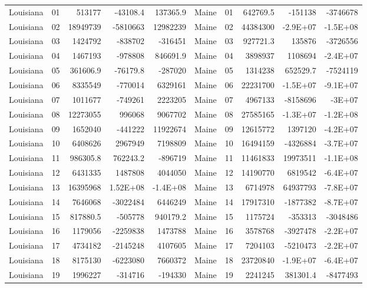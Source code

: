 \begin{landscape}
\begin{singlespace}
\begin{longtable}{lrrrr|lrrrr}
		Louisiana &  01  & 513177 & -43108.4 & 137365.9 & Maine &  01  & 642769.5 & -151138 & -3746678 \\
		Louisiana &  02  & 18949739 & -5810663 & 12982239 & Maine &  02  & 44384300 & -2.9E+07 & -1.5E+08 \\
		Louisiana &  03  & 1424792 & -838702 & -316451 & Maine &  03  & 927721.3 & 135876 & -3726556 \\
		Louisiana &  04  & 1467193 & -978808 & 846691.9 & Maine &  04  & 3898937 & 1108694 & -2.4E+07 \\
		Louisiana &  05  & 361606.9 & -76179.8 & -287020 & Maine &  05  & 1314238 & 652529.7 & -7524119 \\
		Louisiana &  06  & 8335549 & -770014 & 6329161 & Maine &  06  & 22231700 & -1.5E+07 & -9.1E+07 \\
		Louisiana &  07  & 1011677 & -749261 & 2223205 & Maine &  07  & 4967133 & -8158696 & -3E+07 \\
		Louisiana &  08  & 12273055 & 996068 & 9067702 & Maine &  08  & 27585165 & -1.3E+07 & -1.2E+08 \\
		Louisiana &  09  & 1652040 & -441222 & 11922674 & Maine &  09  & 12615772 & 1397120 & -4.2E+07 \\
		Louisiana &  10 & 6408626 & 2967949 & 7198809 & Maine &  10 & 16494159 & -4326884 & -3.7E+07 \\
		Louisiana &  11 & 986305.8 & 762243.2 & -896719 & Maine &  11 & 11461833 & 19973511 & -1.1E+08 \\
		Louisiana &  12 & 6431335 & 1487808 & 4044050 & Maine &  12 & 14190770 & 6819542 & -6.4E+07 \\
		Louisiana &  13 & 16395968 & 1.52E+08 & -1.4E+08 & Maine &  13 & 6714978 & 64937793 & -7.8E+07 \\
		Louisiana &  14 & 7646068 & -3022484 & 6446249 & Maine &  14 & 17917310 & -1877382 & -8.7E+07 \\
		Louisiana &  15 & 817880.5 & -505778 & 940179.2 & Maine &  15 & 1175724 & -353313 & -3048486 \\
		Louisiana &  16 & 1179056 & -2259838 & 1473788 & Maine &  16 & 3578768 & -3927478 & -2.2E+07 \\
		Louisiana &  17 & 4734182 & -2145248 & 4107605 & Maine &  17 & 7204103 & -5210473 & -2.2E+07 \\
		Louisiana &  18 & 8175130 & -6223080 & 7660372 & Maine &  18 & 23720840 & -1.9E+07 & -6.4E+07 \\
		Louisiana &  19 & 1996227 & -314716 & -194330 & Maine &  19 & 2241245 & 381301.4 & -8477493 \\

\end{longtable}
\end{singlespace}
\end{landscape}
